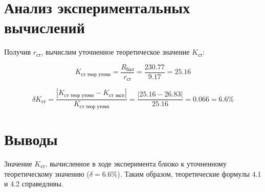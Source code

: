 \section{Анализ экспериментальных вычислений}

Получив $r_\text{ст}$, вычислим уточненное теоретическое значение $K_\text{ст}$:

\begin{displaymath}
K_\text{ст\ \ теор\ \ уточн} = \frac{R_\text{бал}}{r_\text{ст}} = \frac{230.77}{9.17} = 25.16
\end{displaymath}

\begin{displaymath}
\delta K_\text{ст} = \frac{ | K_\text{ст\ \ теор\ \ уточн} - K_\text{ст\ \ эксп} | }{K_\text{ст\ \ теор\ \ уточн}} = \frac{ | 25.16 - 26.83 | }{25.16} = 0.066 = 6.6\%
\end{displaymath}


\section{Выводы}

Значение $K_\text{ст}$, вычисленное в ходе эксперимента близко к уточненному теоретическому значению ($\delta = 6.6\%$). Таким образом, теоретические формулы 4.1 и 4.2 справедливы.


